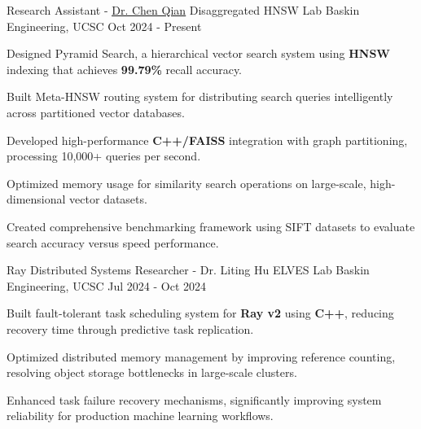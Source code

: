 \begin{cventries}
\vspace{2mm}
\cventry
    {Research Assistant - \href{https://users.soe.ucsc.edu/~qian/}{\uline{Dr. Chen Qian}}} %
    {Disaggregated HNSW Lab} %
    {Baskin Engineering, UCSC} %
    {Oct 2024 - Present} %
    {
        \begin{cvitems}
        \item {Designed Pyramid Search, a hierarchical vector search system using \textbf{HNSW} indexing that achieves \textbf{99.79\%} recall accuracy.}
        \item {Built Meta-HNSW routing system for distributing search queries intelligently across partitioned vector databases.}
        \item {Developed high-performance \textbf{C++/FAISS} integration with graph partitioning, processing 10,000+ queries per second.}
        \item {Optimized memory usage for similarity search operations on large-scale, high-dimensional vector datasets.}
        \item {Created comprehensive benchmarking framework using SIFT datasets to evaluate search accuracy versus speed performance.}
        \end{cvitems}
    }

\vspace{2mm}
\cventry
    {Ray Distributed Systems Researcher - Dr. Liting Hu} %
    {ELVES Lab} %
    {Baskin Engineering, UCSC} %
    {Jul 2024 - Oct 2024} %
    {
      \begin{cvitems}
        \item {Built fault-tolerant task scheduling system for \textbf{Ray v2} using \textbf{C++}, reducing recovery time through predictive task replication.}
        \item {Optimized distributed memory management by improving reference counting, resolving object storage bottlenecks in large-scale clusters.}
        \item {Enhanced task failure recovery mechanisms, significantly improving system reliability for production machine learning workflows.}
      \end{cvitems}
    }


\end{cventries}
